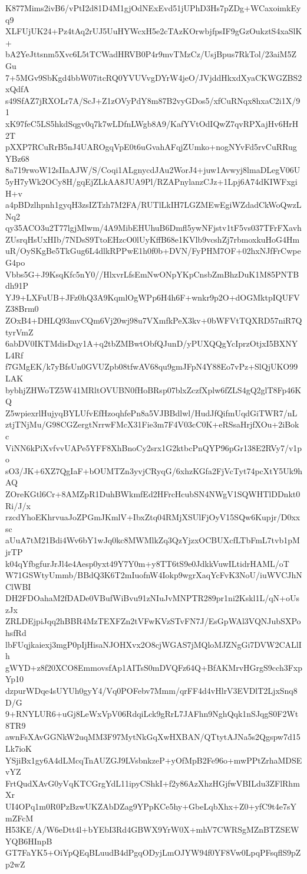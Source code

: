 K877Mims2ivB6/vPtI2d81D4M1gjOdNExEvd51jUPhD3Hs7pZDg+WCaxoimkEyq9
XLFUjUK24+Pz4tAq2rUJ5UuHYWcxH5e2cTAzKOrwbjfpsIF9gGzOukztS4xaSlK+
bA2YeJttsnm5Xvc6L5tTCWadHRVB0P4r9mvTMzCz/UsjBpus7RkTol/23aiM5ZGu
7+5MGv9SbKgd4bbW07itcRQ0YVUVvgDYrW4jeO/JVjddHkxdXyaCKWGZBS2xQdfA
s49SfAZ7jRXOLr7A/ScJ+Z1zOVyPdY8m87B2vyGDos5/xfCuRNqx8hxaC2i1X/91
xK97feC5LS5hkdSqgv0q7k7wLDfnLWgb8A9/KafYVtOdIQwZ7qvRPXajHv6HrH2T
pXXP7RCuRrB5nJ4UAROgqVpE0t6uGvahAFqjZUmko+nogNYvFd5rvCuRRugYBz68
8a719rwoW12sIIaAJW/S/Coqi1ALgnycdJAu2WorJ4+juw1Avwyj8lmaDLegV06U
5yH7yWk2OCy8H/gqEjZLkAA8JUA9Pl/RZAPnylanzCJz+1Lpj6A74dKIWFxgiH+v
a4pBDzlhpnh1gyqH3zsIZTzh7M2FA/RUTlLkIH7LGZMEwEgiWZdadCkWoQwzLNq2
qy35ACO3u2T77lgjMlwm/4A9MibEHUhuB6Dmfl5ywNFjstv1tF5vs037TFrFXavh
ZUsrqHsUxHIb/7NDsS9TtoEHzcO0lUyKffB68e1KVlb9vcshZj7rbmoxkuHoG4Hm
uR/OySKgBe5TkGug6L4dlkRPPwE1h0f0b+DVN/FyPHM7OF+02hxNJfFrCwpeG4po
Vbbs5G+J9KsqKfc5nY0//HlxvrLfsEmNwONpYKpCnsbZmBhzDuK1M85PNTBdh91P
YJ9+LXFuUB+JFz0hQ3A9KqmlOgWPp6H4h6F+wnkr9p2O+dOGMktpIQUFVZ38Brm0
ZOxB4+DHLQ93mvCQm6Vj20wj98u7VXmfkPeX3kv+0bWFVtTQXRD57niR7QtyrVmZ
6abDV0IKTMdisDqy1A+q2tbZMBwtObfQJunD/yPUXQQgYcIprzOtjxI5BXNYL4Rf
f7GMgEK/k7yBfsUn0GVUZpb08tfwAV68qu9gmJFpN4Y88Eo7vPz+SlQjUKO99LAK
bybhjZHWoTZ5W41MRltOVUBN0fHoBRsp07blxZczfXplw6fZLS4gQ2glT8Fp46KQ
Z5wpiexrlHujyqBYLUfvEfHzoqhfePn8a5VJBBdlwl/HudJfQifmUqdGiTWR7/nL
ztjTNjMu/G98CGZergtNrrwFMcX31Fie3m7F4V03cC0K+eRSsaHrjfXOu+2iBokc
ViNN6kPiXvfvvUAPe5YFF8XhBnoCy2srx1G2ktbcPnQYP96pGr138E2RVy7/v1po
sO3/JK+6XZ7QgIaF+bOUMTZn3yvjCRyqG/6xhzKGfa2FjVcTyt74pcXtY5Uk9hAQ
ZOreKGtl6Cr+8AMZpR1DuhBWkmfEd2HFrcHcubSN4NWgV1SQWHTlDDnkt0Ri/J/x
rzcdYhoEKhrvuaJoZPGmJKmlV+IbxZtq04RMjXSUlFjOyV15SQw6Kupjr/D0xxsc
aUuA7tM21Bdi4Wv6bY1wJq0kc8MWMlkZq3QzYjzxOCBUXcfLTbFmL7tvb1pMjrTP
k04qYfbgfurJrJl4e4Aesp0yxt49Y7Y0m+y8TT6tS9e0JdkkVuwILtidrHAML/oT
W71GSWtyUmmb/BBdQ3K6T2mIuofnW4Iokp9wgrXaqYcFvK3NoU/iuWVCJhNClWBI
DH2FDOahaM2fDADe0VBufWiBvu91zNIuJvMNPTR289pr1ni2Kskl1L/qN+oUszJx
ZRLDEjpiJqq2hBBR4MzTEXFZn2tVFwKVzSTvFN7J/EsGpWAl3VQNJubSXPohsfRd
lbFUqjkaiexj3mgP0pIjHisaNJOHXvx2O8cjWGAS7jMQloMJZNgGi7DVW2CALlIh
gWYD+z8f20XCO8EmmovsfAp1AITsS0mDVQFz64Q+BfAKMrvHGrgS9cch3FxpYp10
dzpurWDqe4sUYUh0gyY4/Vq0POFebv7Mmm/qrFF4d4vHlrV3EVDlT2LjxSnq8D/G
9+RNYLUR6+uGj8LeWxVpV06RdqiLck9gRrL7JAFhn9NghQqk1nSJqgS0F2Wt8TR9
awnFsXAvGGNkW2uqMM3F97MytNkGqXwHXBAN/QTtytAJNa5s2Qgspw7d15Lk7ioK
YSjiBx1gy6A4dLMcqTnAUZGJ9LVsbnkzeP+yOfMpB2Fe96o+mwPPtZrhaMDSEvYZ
FrtQudXAvG0yVqKTCGrgYdL11ipyCShkI+f2y86AzXhzHGjfwVBILdu3ZFlRhmXr
UI4OPq1m0R0PzBzwUKZAbDZag9YPpKCe5hy+GbeLqbXhx+Z0+yfC9t4e7sYmZFcM
H53KE/A/W6eDtt4l+bYEbI3Rd4GBWX9YrW0X+mhV7CWRSgMZnBTZSEWYQB6HInpB
GT7FaYK5+OiYpQEqBLuudB4dPgqODyjLmOJYW94f0YF8Vw0LpqPFsqflS9pZp2wZ
